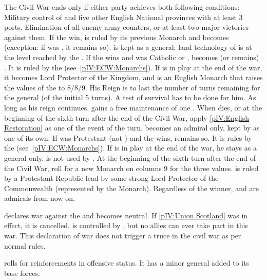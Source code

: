 \phpaix
\aparag The Civil War ends only if either party achieves both following
conditions:
\bparag Military control of  and five other English
National provinces with at least 3 ports.
\bparag Elimination of all enemy army counters, or at least two major
victories against them.
\aparag If the \royal win, \ENG is ruled by its previous Monarch and becomes
\CATHCR (exception: if \ENG was \CATHCO, it remains so). \leaderRupert is kept
as a general; land technology of \ENG is at the level reached by the \royal.
\aparag If the \parl wins and \ENG was Catholic or \PROTANG, \ENG becomes (or
remains) \PROTANG.  It is ruled by the 
(see~\ref{pIV:ECW:Monarchs}).
\bparag If \leaderCromwell is in play at the end of the war, it becomes Lord
Protector of the Kingdom, and is an English Monarch that raises the values of
the  to 8/8/9. His Reign is to last the number of turns
remaining for the general (of the initial 5 turns).  A test of survival has to
be done for him. As long as his reign continues, \ENG gains a free maintenance
of one \ARMY\faceplus.
\bparag When \leaderCromwell dies, or at the beginning of the sixth turn after
the end of the Civil War, apply \ref{pIV:English Restoration} as one of the
event of the turn.
\bparag \leaderRupert becomes an admiral only, kept by \ENG as one of its own.
\aparag If \ENG was Protestant (not \PROTANG) and the \parl wins, \ENG remains
so. It is rules by the  (see~\ref{pIV:ECW:Monarchs}).
\bparag If \leaderCromwell is in play at the end of the war, he stays as a
general only. \leaderRupert is not used by \ENG.
\bparag At the beginning of the sixth turn after the end of the Civil War,
roll for a new Monarch on columns 9 for the three values. \ENG is ruled by a
Protestant Republic lead by some strong Lord Protector of the Commonwealth
(represented by the Monarch).
\aparag Regardless of the winner, \leaderMonck and \leaderBlake are admirals
from now on.



\phevnt
\aparag \paysecosse declares war against the \royal and becomes neutral.  If
\ref{pIV:Union Scotland} was in effect, it is cancelled.  \paysecosse is
controlled by \FRA, but no allies can ever take part in this war. This
declaration of war does not trigger a truce in the civil war as per normal
rules.

\phadm
\aparag \paysecosse rolls for reinforcements in offensive status.  It has a
minor general added to its base forces.


